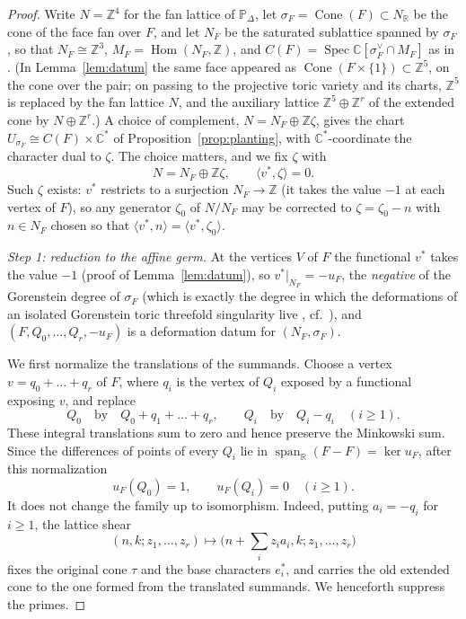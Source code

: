 \documentclass[11pt]{amsart}
\theoremstyle{definition}
\theoremstyle{remark}
\newcommand{\ZZ}{\mathbb{Z}}
\newcommand{\CC}{\mathbb{C}}
\newcommand{\PP}{\mathbb{P}}
\newcommand{\RR}{\mathbb{R}}
\newcommand{\Cone}{\operatorname{Cone}}
\newcommand{\Spec}{\operatorname{Spec}}
\begin{document}
\begin{proof}
Write $N = \ZZ^4$ for the fan lattice of $\PP_\Delta$, let
$\sigma_F = \Cone(F) \subset N_\RR$ be the cone of the face fan over
$F$, and let $N_F$ be the saturated sublattice spanned by $\sigma_F$, so
that $N_F \cong \ZZ^3$, $M_F = \operatorname{Hom}(N_F,\ZZ)$, and
$C(F) = \Spec\CC[\sigma_F^\vee \cap M_F]$ as in \cite[\S2]{paper1}.
(In Lemma~\ref{lem:datum} the same face appeared as
$\Cone(F\times\{1\}) \subset \ZZ^5$, on the cone over the pair; on
passing to the projective toric variety and its charts, $\ZZ^5$ is
replaced by the fan lattice $N$, and the auxiliary lattice
$\ZZ^5 \oplus \ZZ^r$ of the extended cone by $N \oplus \ZZ^r$.)  A
choice of complement, $N = N_F \oplus \ZZ\zeta$, gives the chart
$U_{\sigma_F} \cong C(F)\times\CC^\ast$ of
Proposition~\ref{prop:planting}, with $\CC^\ast$-coordinate the
character dual to $\zeta$.  The choice matters, and we fix $\zeta$ with
\[
N = N_F \oplus \ZZ\zeta, \qquad \langle v^\ast, \zeta\rangle = 0 .
\]
Such $\zeta$ exists: $v^\ast$ restricts to a surjection $N_F \to \ZZ$
(it takes the value $-1$ at each vertex of $F$), so any generator
$\zeta_0$ of $N/N_F$ may be corrected to $\zeta = \zeta_0 - n$ with
$n \in N_F$ chosen so that
$\langle v^\ast, n\rangle = \langle v^\ast, \zeta_0\rangle$.

\emph{Step 1: reduction to the affine germ.}  At the vertices $V$ of
$F$ the functional $v^\ast$ takes the value $-1$ (proof of
Lemma~\ref{lem:datum}), so $v^\ast|_{N_F} = -u_F$, the \emph{negative}
of the Gorenstein degree of $\sigma_F$ (which is exactly the degree
in which the deformations of an isolated Gorenstein toric threefold
singularity live \cite{Altmann95}, cf.\ \cite[Rem.~3.7]{Petracci18}),
and $(F, Q_0,\dots,Q_r, -u_F)$ is a deformation datum for
$(N_F,\sigma_F)$.

We first normalize the translations of the summands.  Choose a vertex
$v=q_0+\dots+q_r$ of $F$, where $q_i$ is the vertex of $Q_i$ exposed by
a functional exposing $v$, and replace
\[
 Q_0\quad\text{by}\quad Q_0+q_1+\dots+q_r,
 \qquad
 Q_i\quad\text{by}\quad Q_i-q_i\quad (i\geq 1).
\]
These integral translations sum to zero and hence preserve the Minkowski
sum.  Since the differences of points of every $Q_i$ lie in
$\operatorname{span}_{\RR}(F-F)=\ker u_F$, after this normalization
\[
 u_F(Q_0)=1,\qquad u_F(Q_i)=0\quad(i\geq1).
\]
It does not change the family up to isomorphism.  Indeed, putting
$a_i=-q_i$ for $i\geq1$, the lattice shear
\[
 (n,k;z_1,\dots,z_r)\longmapsto
 \bigl(n+\textstyle\sum_i z_i a_i,k;z_1,\dots,z_r\bigr)
\]
fixes the original cone $\tau$ and the base characters $e_i^\ast$, and
carries the old extended cone to the one formed from the translated
summands.  We henceforth suppress the primes.


\end{proof}
\end{document}
